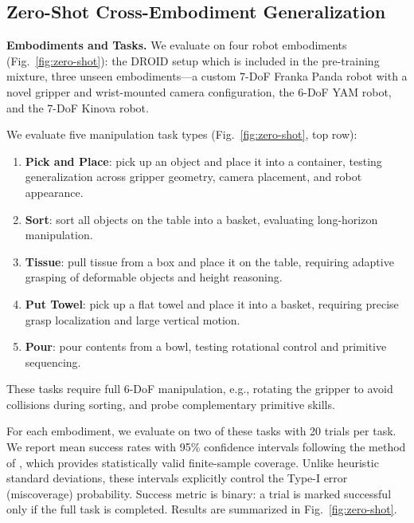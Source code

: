 \subsection{Zero-Shot Cross-Embodiment Generalization}
\label{subsec:zero_shot}



\noindent\textbf{Embodiments and Tasks.}
We evaluate on four robot embodiments (Fig.~\ref{fig:zero-shot}): the DROID setup \cite{khazatsky2025droidlargescaleinthewildrobot} which is included in the pre-training mixture, three unseen embodiments---a custom 7-DoF Franka Panda robot with a novel gripper and wrist-mounted camera configuration, the 6-DoF YAM robot, and the 7-DoF Kinova robot.

We evaluate five manipulation task types (Fig.~\ref{fig:zero-shot}, top row):
\begin{enumerate}
    \item \textbf{Pick and Place}: pick up an object and place it into a container, testing generalization across gripper geometry, camera placement, and robot appearance.
    \item \textbf{Sort}: sort all objects on the table into a basket, evaluating long-horizon manipulation.
    \item \textbf{Tissue}: pull tissue from a box and place it on the table, requiring adaptive grasping of deformable objects and height reasoning.
    \item \textbf{Put Towel}: pick up a flat towel and place it into a basket, requiring precise grasp localization and large vertical motion.
    \item \textbf{Pour}: pour contents from a bowl, testing rotational control and primitive sequencing.
\end{enumerate}

These tasks require full 6-DoF manipulation, e.g., rotating the gripper to avoid collisions during sorting, and probe complementary primitive skills.

For each embodiment, we evaluate on two of these tasks with 20 trials per task. We report mean success rates with 95\% confidence intervals following the method of \cite{vincent2024generalizablebehaviorcloningpolicy}, which provides statistically valid finite-sample coverage. Unlike heuristic standard deviations, these intervals explicitly control the Type-I error (miscoverage) probability. Success metric is binary: a trial is marked successful only if the full task is completed. Results are summarized in Fig.~\ref{fig:zero-shot}.


